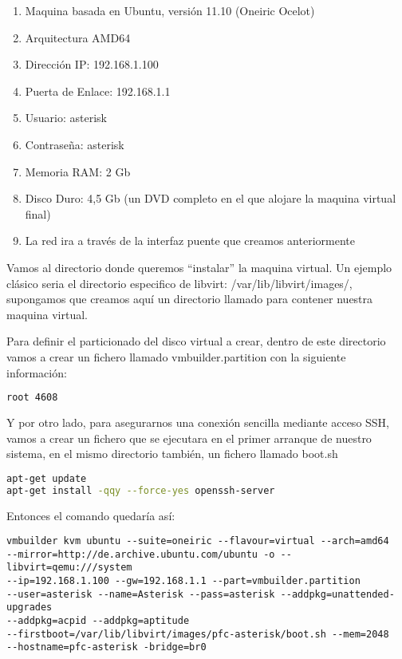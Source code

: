 \begin{enumerate}
\item Maquina basada en Ubuntu, versión 11.10 (Oneiric Ocelot)
\item Arquitectura AMD64
\item Dirección IP: 192.168.1.100
\item Puerta de Enlace: 192.168.1.1
\item Usuario: asterisk
\item Contraseña: asterisk
\item Memoria RAM: 2 Gb
\item Disco Duro: 4,5 Gb (un DVD completo en el que alojare la maquina virtual final)
\item La red ira a través de la interfaz puente que creamos anteriormente
\end{enumerate}

Vamos al directorio donde queremos “instalar” la maquina virtual. Un ejemplo clásico seria el directorio especifico de libvirt: /var/lib/libvirt/images/, supongamos que creamos aquí un directorio llamado  para contener nuestra maquina virtual. 

Para definir el particionado del disco virtual a crear, dentro de este directorio vamos a crear un fichero llamado vmbuilder.partition con la siguiente información:

\begin{lstlisting}[language=bash]
root 4608
\end{lstlisting}

Y por otro lado, para asegurarnos una conexión sencilla mediante acceso SSH, vamos a crear un fichero que se ejecutara en el primer arranque de nuestro sistema, en el mismo directorio también, un fichero llamado boot.sh

\begin{lstlisting}[language=bash]
apt-get update
apt-get install -qqy --force-yes openssh-server
\end{lstlisting}

Entonces el comando quedaría así:

\begin{lstlisting}[style=consola]
vmbuilder kvm ubuntu --suite=oneiric --flavour=virtual --arch=amd64 
--mirror=http://de.archive.ubuntu.com/ubuntu -o --libvirt=qemu:///system 
--ip=192.168.1.100 --gw=192.168.1.1 --part=vmbuilder.partition 
--user=asterisk --name=Asterisk --pass=asterisk --addpkg=unattended-upgrades 
--addpkg=acpid --addpkg=aptitude 
--firstboot=/var/lib/libvirt/images/pfc-asterisk/boot.sh --mem=2048 
--hostname=pfc-asterisk -bridge=br0
\end{lstlisting}

